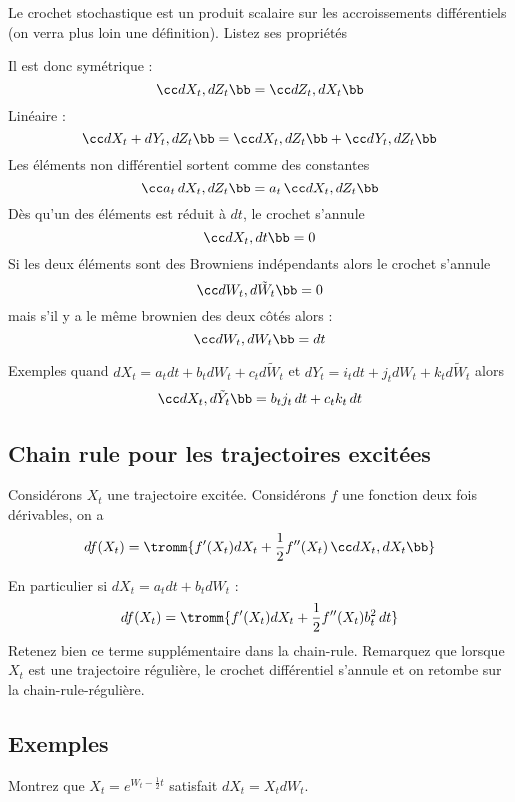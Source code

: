 \documentclass{article}
\begin{document}
Le crochet stochastique est un produit scalaire sur les accroissements différentiels (on verra plus loin une définition). Listez ses propriétés

\begin{grostro}
Il est donc symétrique :
$$
\cc dX_t , dZ_t\bb=\cc  dZ_t, dX_t\bb
$$
Linéaire :
$$
\cc dX_t + dY_t, dZ_t\bb  = \cc dX_t , dZ_t\bb+\cc dY_t, dZ_t\bb
$$
Les éléments non différentiel sortent comme des constantes
$$
 \cc a_t\, dX_t , dZ_t\bb  =    a_t\,  \cc  dX_t , dZ_t\bb
$$
Dès qu'un des éléments est réduit à $dt$, le crochet s'annule
$$
\cc dX_t, dt\bb =0 
$$
Si les deux éléments sont des Browniens indépendants alors le crochet s'annule
$$
\cc dW_t, d\tilde W_t  \bb =0 
$$
mais s'il y a le même brownien des deux côtés alors :
$$
\cc dW_t, d W_t  \bb = dt
$$
\end{grostro}


Exemples quand $dX_t = a_t dt +  b_t  dW_t + c_t d\tilde W_t$ et $d Y_t = i_t dt + j_t dW_t + k_t d\tilde W_t$ alors
\begin{alignat*}{1}
\cc dX_t, d \tilde Y_t   \bb = b_t j_t \, dt + c_tk_t \, dt
\end{alignat*}


\subsection{Chain rule pour les trajectoires excitées}


\begin{theoreme} Considérons $X_t$ une trajectoire excitée. Considérons $f$ une fonction deux fois dérivables, on a 
$$
df(X_t) =  \tromm{ f'(X_t) dX_t   +   \frac 1 2 f''(X_t) \, \cc dX_t,dX_t\bb}
$$
\end{theoreme}
En particulier si $dX_t =a_t dt + b_t dW_t$ : 
$$
df(X_t) =\tromm{ f'(X_t) dX_t   +   \frac 1 2 f''(X_t)  b_t^2 \, dt}
$$
Retenez bien ce terme supplémentaire dans la chain-rule.  
Remarquez que lorsque $X_t$ est une trajectoire régulière, le crochet différentiel s'annule et on retombe sur la chain-rule-régulière. 


\subsection{Exemples}

 Montrez que  $X_t = e^{W_t - \frac 1 2 t}$  satisfait $dX_t = X_t dW_t$. 
 \begin{grostro}
 
 \vspace{3cm}
 
 \end{grostro}
\end{document}
